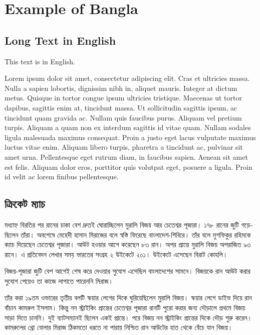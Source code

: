 \chapter{Example of Bangla}

\section{Long Text in English}

This text is in English.


Lorem ipsum dolor sit amet, consectetur adipiscing elit. Cras et
ultricies massa. Nulla a sapien lobortis, dignissim nibh in, aliquet
mauris. Integer at dictum metus. Quisque in tortor congue ipsum
ultricies tristique. Maecenas ut tortor dapibus, sagittis enim at,
tincidunt massa. Ut sollicitudin sagittis ipsum, ac tincidunt quam
gravida ac. Nullam quis faucibus purus. Aliquam vel pretium
turpis. Aliquam a quam non ex interdum sagittis id vitae quam. Nullam
sodales ligula malesuada maximus consequat. Proin a justo eget lacus
vulputate maximus luctus vitae enim. Aliquam libero turpis, pharetra a
tincidunt ac, pulvinar sit amet urna. Pellentesque eget rutrum diam,
in faucibus sapien. Aenean sit amet est felis. Aliquam dolor eros,
porttitor quis volutpat eget, posuere a ligula. Proin id velit ac
lorem finibus pellentesque.

\section{\textbengali{ক্রিকেট ম্যাচ}}

\begin{bengali}
  মধ্যাহ্ন বিরতির পর রানের চাকা বেশ দ্রুতই ঘোরাচ্ছিলেন মুরালি বিজয় আর
  চেতেশ্বর পূজারা। ১৭৮ রানের জুটি গড়েছিলেন তাঁরা। অবশেষে মেহেদী হাসান
  মিরাজের বলে স্বস্তি ফিরেছে বাংলাদেশ-শিবিরে। তাঁর বলে মুশফিকুর রহিমকে ক্যাচ
  দিয়েছেন চেতেশ্বর পূজারা। আউট হওয়ার আগে করেছেন ৮৩ রান। অপর প্রান্তে মুরালি
  বিজয় অপরাজিত ৯৩ রানে। এ প্রতিবেদন লেখার সময় ভারতের সংগ্রহ ২ উইকেটে
  ২০১। উইকেটে এসেছেন বিরাট কোহলি।

  বিজয়-পূজারা জুটি বেশ আগেই শেষ করে দেওয়ার সুযোগ এসেছিল বাংলাদেশের সামনে।
  বিজয়কে রান আউট করার সুযোগ পেয়েও তা কাজে লাগাতে পারেননি মিরাজ।

  তাঁর করা ১৯তম ওভারের তৃতীয় বলটি স্কয়ার লেগের দিকে ঘুরিয়েছিলেন মুরালি
  বিজয়। স্কয়ার লেগে ডাইভ দিয়ে রান বাঁচান কামরুল ইসলাম। কিন্তু নন স্ট্রাইকিং
  প্রান্তের চেতেশ্বর পূজারা রানটি পুরো করার জন্য দৌড়ালে প্রথমে বিজয় সাড়া দিতে
  চাননি। দুই ব্যাটসম্যানই ছিলেন একই প্রান্তে। পরে বিজয় নন স্ট্রাইকিং প্রান্তের
  দিকে দৌড় শুরু করেন। কামরুলের থ্রো বোলার মিরাজ ঠিকমতো ধরতে না পারায়
  নিশ্চিত রান আউটের হাত থেকে বেঁচে যান বিজয়।
\end{bengali}